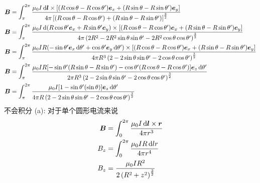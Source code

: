  \begin{align*}
    \boldsymbol{B}&=\int_{\pi}^{2\pi}\frac{\mu_0 I\dif\boldsymbol l\times \left[(R\cos\theta-R\cos\theta')\boldsymbol{e}_x+(R\sin\theta-R\sin\theta')\boldsymbol{e}_y\right]}{4\pi \left[(R\cos\theta-R\cos\theta')+(R\sin\theta-R\sin\theta')\right]^\frac{3}{2}}\\
    \boldsymbol{B}&=\int_{\pi}^{2\pi}\frac{\mu_0 I\dif(R\cos\theta'\boldsymbol{e}_x+R\sin\theta'\boldsymbol{e}_y)\times \left[(R\cos\theta-R\cos\theta')\boldsymbol{e}_x+(R\sin\theta-R\sin\theta')\boldsymbol{e}_y\right]}{4\pi \left(2R^2-2R^2\sin\theta\sin\theta'-2R^2\cos\theta\cos\theta'\right)^\frac{3}{2}}\\
    \boldsymbol{B}&=\int_{\pi}^{2\pi}\frac{\mu_0 IR(-\sin\theta'\boldsymbol{e}_x\dif\theta'+\cos\theta'\boldsymbol{e}_y\dif\theta')\times \left[(R\cos\theta-R\cos\theta')\boldsymbol{e}_x+(R\sin\theta-R\sin\theta')\boldsymbol{e}_y\right]}{4\pi R^3\left(2-2\sin\theta\sin\theta'-2\cos\theta\cos\theta'\right)^\frac{3}{2}}\\
    \boldsymbol{B}&=\int_{\pi}^{2\pi}\frac{\mu_0 IR[-\sin\theta'(R\sin\theta-R\sin\theta')-\cos\theta'(R\cos\theta-R\cos\theta')]\boldsymbol{e}_z\dif\theta'}{2\pi R^3\left(2-2\sin\theta\sin\theta'-2\cos\theta\cos\theta'\right)^\frac{3}{2}}\\
    \boldsymbol{B}&=\int_{\pi}^{2\pi}\frac{\mu_0 I[1-\sin\theta'(\sin\theta)]\boldsymbol{e}_z\dif\theta'}{4\pi R\left(2-2\sin\theta\sin\theta'-2\cos\theta\cos\theta'\right)^\frac{3}{2}}
 \end{align*}
 不会积分
(a):
对于单个圆形电流来说
\begin{align*}
    \boldsymbol{B}&=\int_{0}^{2\pi}\frac{\mu_0 I\dif \boldsymbol{l}\times\boldsymbol{r}}{4\pi r^3}\\
    B_z&=\int_{0}^{2\pi}\frac{\mu_0 IR\dif lr}{4\pi r^4}\\
    B_z&=\frac{\mu_0 IR^2}{2 \left(R^2+z^2\right)^\frac{3}{2}}
\end{align*}

